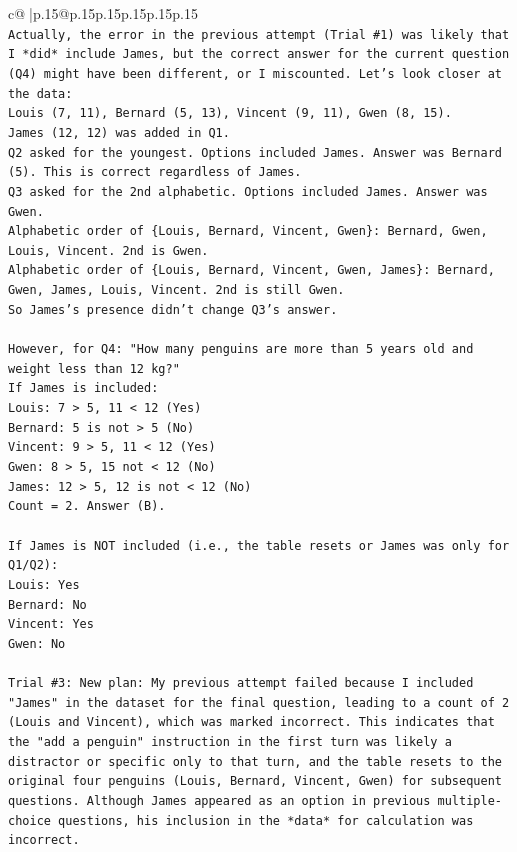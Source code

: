 \documentclass{article}
\begin{document}
{\begin{supertabular}{c@{$\;$}|p{.15\linewidth}@{}p{.15\linewidth}p{.15\linewidth}p{.15\linewidth}p{.15\linewidth}p{.15\linewidth}}
{{{\\ 
\texttt{Actually, the error in the previous attempt (Trial \#1) was likely that I *did* include James, but the correct answer for the current question (Q4) might have been different, or I miscounted. Let's look closer at the data:} \\
\texttt{Louis (7, 11), Bernard (5, 13), Vincent (9, 11), Gwen (8, 15).} \\
\texttt{James (12, 12) was added in Q1.} \\
\texttt{Q2 asked for the youngest. Options included James. Answer was Bernard (5). This is correct regardless of James.} \\
\texttt{Q3 asked for the 2nd alphabetic. Options included James. Answer was Gwen.} \\
\texttt{Alphabetic order of \{Louis, Bernard, Vincent, Gwen\}: Bernard, Gwen, Louis, Vincent. 2nd is Gwen.} \\
\texttt{Alphabetic order of \{Louis, Bernard, Vincent, Gwen, James\}: Bernard, Gwen, James, Louis, Vincent. 2nd is still Gwen.} \\
\texttt{So James's presence didn't change Q3's answer.} \\
\\ 
\texttt{However, for Q4: "How many penguins are more than 5 years old and weight less than 12 kg?"} \\
\texttt{If James is included:} \\
\texttt{Louis: 7 > 5, 11 < 12 (Yes)} \\
\texttt{Bernard: 5 is not > 5 (No)} \\
\texttt{Vincent: 9 > 5, 11 < 12 (Yes)} \\
\texttt{Gwen: 8 > 5, 15 not < 12 (No)} \\
\texttt{James: 12 > 5, 12 is not < 12 (No)} \\
\texttt{Count = 2. Answer (B).} \\
\\ 
\texttt{If James is NOT included (i.e., the table resets or James was only for Q1/Q2):} \\
\texttt{Louis: Yes} \\
\texttt{Bernard: No} \\
\texttt{Vincent: Yes} \\
\texttt{Gwen: No} \\
\\ 
\texttt{Trial \#3: New plan: My previous attempt failed because I included "James" in the dataset for the final question, leading to a count of 2 (Louis and Vincent), which was marked incorrect. This indicates that the "add a penguin" instruction in the first turn was likely a distractor or specific only to that turn, and the table resets to the original four penguins (Louis, Bernard, Vincent, Gwen) for subsequent questions. Although James appeared as an option in previous multiple{-}choice questions, his inclusion in the *data* for calculation was incorrect.} \\
}}}
\end{supertabular}}
\end{document}
